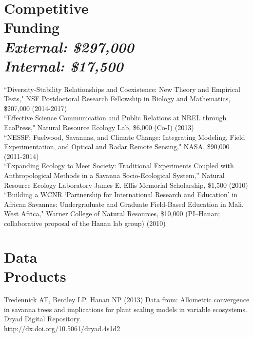 \documentclass[margin,line]{resume}
\begin{document}
\begin{resume}
    \section{\mysidestyle Competitive\\Funding\\\textsl{\footnotesize External: \$297,000}\\\textsl{\footnotesize Internal: \$17,500}}
    ``Diversity-Stability Relationships and Coexistence: New Theory and Empirical Tests," NSF Postdoctoral Research Fellowship in Biology and Mathematics, \$207,000 (2014-2017)\vspace{2mm}\\%
    ``Effective Science Communication and Public Relations at NREL through EcoPress," Natural Resource Ecology Lab, \$6,000 (Co-I) (2013) \vspace{2mm}\\%
    ``NESSF: Fuelwood, Savannas, and Climate Change: Integrating Modeling, Field Experimentation, and Optical and Radar Remote Sensing," NASA, \$90,000 (2011-2014) \vspace{2mm}\\%
    ``Expanding Ecology to Meet Society: Traditional Experiments Coupled with Anthropological Methods in a Savanna Socio-Ecological System,'' Natural Resource Ecology Laboratory James E. Ellis Memorial Scholarship, \$1,500 (2010)\vspace{2mm}\\%
    ``Building a WCNR `Partnership for International Research and Education' in African Savannas: Undergraduate and Graduate Field-Based Education in Mali, West Africa," Warner College of Natural Resources, \$10,000 (PI--Hanan; collaborative proposal of the Hanan lab group) (2010)%
    
    \section{\mysidestyle Data\\Products}
    Tredennick AT, Bentley LP, Hanan NP (2013) Data from: Allometric convergence in savanna trees and implications for plant scaling models in variable ecosystems. Dryad Digital Repository. \\ http://dx.doi.org/10.5061/dryad.4s1d2 \vspace{-6mm}\\%
    

\end{resume}
\end{document}
